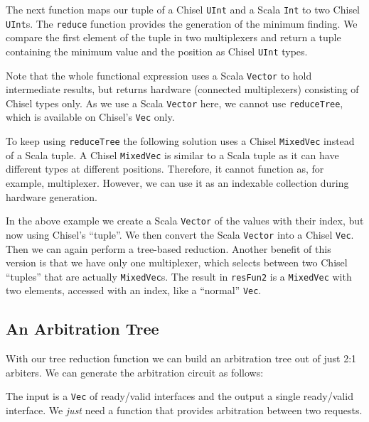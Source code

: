 \documentclass[%
    10pt,
    headinclude, footexclude,
    openright, %
    notitlepage,
    cleardoubleempty,
    headsepline,
    pointlessnumbers,
    bibtotoc, idxtotoc,
    ]{scrbook}
\newcommand{\code}[1]{{\small{\texttt{#1}}}}
\begin{document}
The next function maps our tuple of a Chisel \code{UInt}
and a Scala \code{Int} to two Chisel \code{UInt}s. The \code{reduce} function provides the generation of
the minimum finding. We compare the first element of the tuple in two multiplexers and return
a tuple containing the minimum value and the position as Chisel \code{UInt} types.


Note that the whole functional expression uses a Scala \code{Vector} to hold intermediate results,
but returns hardware (connected multiplexers) consisting of Chisel types only.
As we use a Scala \code{Vector} here, we cannot use \code{reduceTree}, which is available on Chisel's
\code{Vec} only.

To keep using \code{reduceTree} the following solution uses a Chisel \code{MixedVec}
instead of a Scala tuple.
A Chisel \code{MixedVec} is similar to a Scala tuple as it can have different types at different positions.
Therefore, it cannot function as, for example, multiplexer. However, we can use it as an
indexable collection during hardware generation.



In the above example we create a Scala \code{Vector} of the values with their index, but now
using Chisel's ``tuple''. We then convert the Scala \code{Vector} into a Chisel \code{Vec}.
Then we can again perform a tree-based reduction. Another benefit of this version is
that we have only one multiplexer, which selects between two Chisel ``tuples'' that are actually
\code{MixedVec}s.
The result in \code{resFun2} is a \code{MixedVec} with two elements,
accessed with an index, like a ``normal'' \code{Vec}.

\subsection{An Arbitration Tree}
\label{sec:arbiter}

With our tree reduction function we can build an arbitration tree out of just 2:1 arbiters.
We can generate the arbitration circuit as follows:


\noindent The input is a \code{Vec} of ready/valid interfaces and the output a single ready/valid
interface. We \emph{just} need a function that provides arbitration between two requests.
\end{document}
